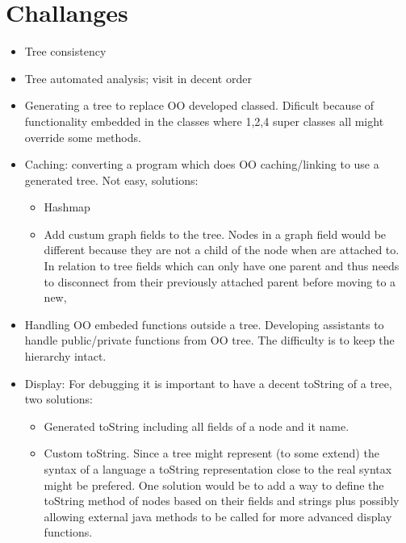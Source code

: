 \documentclass{overturerepchap}
\begin{document}
\chapter{Challanges}

\begin{itemize}
\item Tree consistency
\item Tree automated analysis; visit in decent order
\item Generating a tree to replace OO developed classed. Dificult because of functionality embedded in the classes where 1,2,4 super classes all might override some methods.
\item Caching: converting a program which does OO caching/linking to use a generated tree. Not easy, solutions:
	\begin{itemize}
		\item Hashmap
		\item Add custum graph fields to the tree. Nodes in a graph field would be different because they are not a child of the node when are attached to. In relation to tree fields which can only have one parent and thus needs to disconnect from their previously attached parent before moving to a new,
	\end{itemize}
\item Handling OO embeded functions outside a tree. Developing assistants to handle public/private functions from OO tree. The difficulty is to keep the hierarchy intact.
\item Display: For debugging it is important to have a decent toString of a tree, two solutions:
	\begin{itemize}
		\item Generated toString including all fields of a node and it name.
		\item Custom toString. Since a tree might represent (to some extend) the syntax of a language a toString representation close to the real syntax might be prefered. One solution would be to add a way to define the toString method of nodes based on their fields and strings plus possibly allowing external java methods to be called for more advanced display functions.
	\end{itemize}
\end{itemize}
\end{document}
